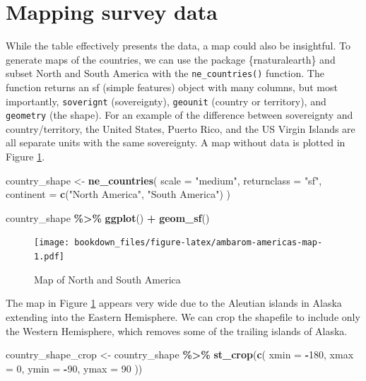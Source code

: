 \documentclass[
]{krantz}
\makeatletter
\newenvironment{Shaded}{\begin{snugshade}}{\end{snugshade}}
\newcommand{\AttributeTok}[1]{\textcolor[rgb]{0.27,0.27,0.27}{#1}}
\newcommand{\DecValTok}[1]{\textcolor[rgb]{0.06,0.06,0.06}{#1}}
\newcommand{\FunctionTok}[1]{\textcolor[rgb]{0.27,0.27,0.27}{\textbf{#1}}}
\newcommand{\NormalTok}[1]{#1}
\newcommand{\OtherTok}[1]{\textcolor[rgb]{0.37,0.37,0.37}{#1}}
\newcommand{\SpecialCharTok}[1]{\textcolor[rgb]{0.43,0.43,0.43}{\textbf{#1}}}
\newcommand{\StringTok}[1]{\textcolor[rgb]{0.5,0.5,0.5}{#1}}
\newenvironment{kframe}{%
\medskip{}
\setlength{\fboxsep}{.8em}
 \def\at@end@of@kframe{}%
 \ifinner\ifhmode%
  \def\at@end@of@kframe{\end{minipage}}%
  \begin{minipage}{\columnwidth}%
 \fi\fi%
 \def\FrameCommand##1{\hskip\@totalleftmargin \hskip-\fboxsep
 \colorbox{shadecolor}{##1}\hskip-\fboxsep
     \hskip-\linewidth \hskip-\@totalleftmargin \hskip\columnwidth}%
 \MakeFramed {\advance\hsize-\width
   \@totalleftmargin\z@ \linewidth\hsize
   \@setminipage}}%
 {\par\unskip\endMakeFramed%
 \at@end@of@kframe}
\renewenvironment{Shaded}{\begin{kframe}}{\end{kframe}}
\makeatother
\begin{document}
\hypertarget{ambarom-maps}{%
\section{Mapping survey data}\label{ambarom-maps}}

While the table effectively presents the data, a map could also be insightful. To generate maps of the countries, we can use the package \{rnaturalearth\} and subset North and South America with the \texttt{ne\_countries()} function. The function returns an sf (simple features) object with many columns, but most importantly, \texttt{soverignt} (sovereignty), \texttt{geounit} (country or territory), and \texttt{geometry} (the shape). For an example of the difference between sovereignty and country/territory, the United States, Puerto Rico, and the US Virgin Islands are all separate units with the same sovereignty. A map without data is plotted in Figure \ref{fig:ambarom-americas-map}.

\begin{Shaded}
\begin{Highlighting}[]
\NormalTok{country\_shape }\OtherTok{\textless{}{-}}
  \FunctionTok{ne\_countries}\NormalTok{(}
    \AttributeTok{scale =} \StringTok{"medium"}\NormalTok{,}
    \AttributeTok{returnclass =} \StringTok{"sf"}\NormalTok{,}
    \AttributeTok{continent =} \FunctionTok{c}\NormalTok{(}\StringTok{"North America"}\NormalTok{, }\StringTok{"South America"}\NormalTok{)}
\NormalTok{  )}

\NormalTok{country\_shape }\SpecialCharTok{\%\textgreater{}\%}
  \FunctionTok{ggplot}\NormalTok{() }\SpecialCharTok{+}
  \FunctionTok{geom\_sf}\NormalTok{()}
\end{Highlighting}
\end{Shaded}

\begin{figure}
\centering
\texttt{[image: bookdown\_files/figure-latex/ambarom-americas-map-1.pdf]}
\caption{\label{fig:ambarom-americas-map}Map of North and South America}
\end{figure}

The map in Figure \ref{fig:ambarom-americas-map} appears very wide due to the Aleutian islands in Alaska extending into the Eastern Hemisphere. We can crop the shapefile to include only the Western Hemisphere, which removes some of the trailing islands of Alaska.

\begin{Shaded}
\begin{Highlighting}[]
\NormalTok{country\_shape\_crop }\OtherTok{\textless{}{-}}\NormalTok{ country\_shape }\SpecialCharTok{\%\textgreater{}\%}
  \FunctionTok{st\_crop}\NormalTok{(}\FunctionTok{c}\NormalTok{(}
    \AttributeTok{xmin =} \SpecialCharTok{{-}}\DecValTok{180}\NormalTok{,}
    \AttributeTok{xmax =} \DecValTok{0}\NormalTok{,}
    \AttributeTok{ymin =} \SpecialCharTok{{-}}\DecValTok{90}\NormalTok{,}
    \AttributeTok{ymax =} \DecValTok{90}
\NormalTok{  ))}
\end{Highlighting}
\end{Shaded}
\end{document}
